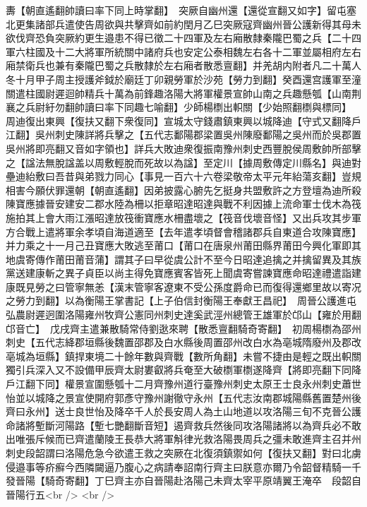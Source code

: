 夀【朝直遙翻帥讀曰率下同上時掌翻】　突厥自幽州還【還從宣翻又如字】留屯塞北更集諸部兵遣使告周欲與共擊齊如前約閏月乙巳突厥寇齊幽州晉公護新得其母未欲伐齊恐負突厥約更生邉患不得已徵二十四軍及左右廂散隸秦隴巴蜀之兵【二十四軍六柱國及十二大將軍所統關中諸府兵也安定公泰相魏左右各十二軍並屬相府左右廂禁衛兵也兼有秦隴巴蜀之兵散隸於左右廂者散悉亶翻】并羌胡内附者凡二十萬人冬十月甲子周主授護斧鉞於廟廷丁卯親勞軍於沙苑【勞力到翻】癸酉還宫護軍至潼關遣柱國尉遲迴帥精兵十萬為前鋒趣洛陽大將軍權景宣帥山南之兵趣懸瓠【山南荆襄之兵尉紆勿翻帥讀曰率下同趣七喻翻】少師楊檦出軹關【少始照翻檦與標同】　周迪復出東興【復扶又翻下衆復同】宣城太守錢肅鎮東興以城降迪【守式又翻降戶江翻】吳州刺史陳詳將兵擊之【五代志鄱陽郡梁置吳州陳廢鄱陽之吳州而於吳郡置吳州將即亮翻又音如字領也】詳兵大敗迪衆復振南豫州刺史西豐脫侯周敷帥所部擊之【諡法無脫諡盖以周敷輕脫而死故以為諡】至定川【據周敷傳定川縣名】與迪對壘迪紿敷曰吾昔與弟戮力同心【事見一百六十六卷梁敬帝太平元年紿蕩亥翻】豈規相害今願伏罪還朝【朝直遙翻】因弟披露心腑先乞挺身共盟敷許之方登壇為迪所殺　陳寶應據晉安建安二郡水陸為柵以拒章昭達昭達與戰不利因據上流命軍士伐木為筏施拍其上會大雨江漲昭達放筏衝寶應水柵盡壞之【筏音伐壞音怪】又出兵攻其步軍方合戰上遣將軍余孝頃自海道適至【去年遣孝頃督會稽諸郡兵自東道合攻陳寶應】并力乘之十一月己丑寶應大敗逃至莆口【莆口在唐泉州莆田縣界莆田今興化軍即其地虞寄傳作莆田莆音蒲】謂其子曰早從虞公計不至今日昭達追擒之并擒留異及其族黨送建康斬之異子貞臣以尚主得免寶應賓客皆死上聞虞寄嘗諫寶應命昭達禮遣詣建康既見勞之曰管寧無恙【漢末管寧客遼東不受公孫度爵命已而復得還鄉里故以寄况之勞力到翻】以為衡陽王掌書記【上子伯信封衡陽王奉獻王昌祀】　周晉公護進屯弘農尉遲迥圍洛陽雍州牧齊公憲同州刺史達奚武涇州總管王雄軍於邙山【雍於用翻邙音亡】　戊戌齊主遣兼散騎常侍劉逖來聘【散悉亶翻騎奇寄翻】　初周楊檦為邵州刺史【五代志絳郡垣縣後魏置邵郡及白水縣後周置邵州改白水為亳城隋廢州及郡改亳城為垣縣】鎮捍東境二十餘年數與齊戰【數所角翻】未嘗不捷由是輕之既出軹關獨引兵深入又不設備甲辰齊太尉婁叡將兵奄至大破檦軍檦遂降齊【將即亮翻下同降戶江翻下同】權景宣圍懸瓠十二月齊豫州道行臺豫州刺史太原王士良永州刺史蕭世怡並以城降之景宣使開府郭彥守豫州謝徹守永州【五代志汝南郡城陽縣舊置楚州後齊曰永州】送士良世怡及降卒千人於長安周人為土山地道以攻洛陽三旬不克晉公護命諸將塹斷河陽路【塹七艷翻斷音短】遏齊救兵然後同攻洛陽諸將以為齊兵必不敢出唯張斥候而已齊遣蘭陵王長恭大將軍斛律光救洛陽畏周兵之彊未敢進齊主召并州刺史段韶謂曰洛陽危急今欲遣王救之突厥在北復須鎮禦如何【復扶又翻】對曰北虜侵邉事等疥癬今西隣闚逼乃腹心之病請奉詔南行齊主曰朕意亦爾乃令韶督精騎一千發晉陽【騎奇寄翻】丁巳齊主亦自晉陽赴洛陽己未齊太宰平原靖翼王淹卒　段韶自晉陽行五<br />
<br />
